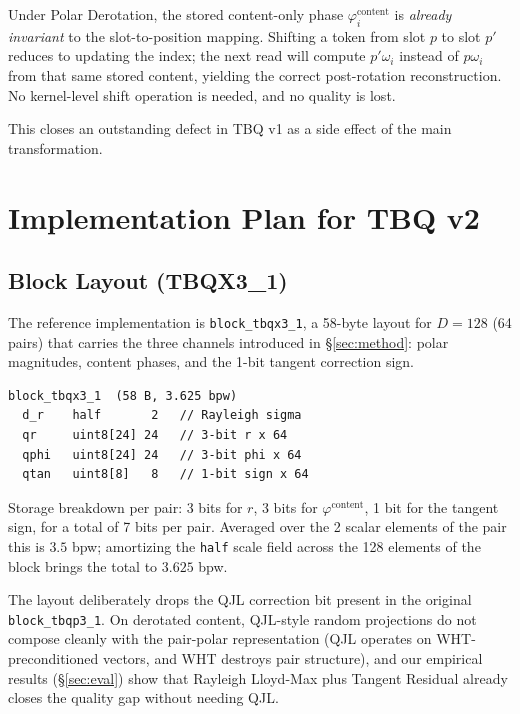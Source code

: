 \documentclass[10pt,twocolumn]{article}
\begin{document}
Under Polar Derotation, the stored content-only phase $\varphi^{\text{content}}_i$ is \emph{already invariant} to the slot-to-position mapping. Shifting a token from slot $p$ to slot $p'$ reduces to updating the index; the next read will compute $p'\omega_i$ instead of $p\omega_i$ from that same stored content, yielding the correct post-rotation reconstruction. No kernel-level shift operation is needed, and no quality is lost.

This closes an outstanding defect in TBQ v1 as a side effect of the main transformation.

\section{Implementation Plan for TBQ v2}
\label{sec:impl}

\subsection{Block Layout (TBQX3\_1)}

The reference implementation is \texttt{block\_tbqx3\_1}, a 58-byte layout for $D=128$ (64 pairs) that carries the three channels introduced in \S\ref{sec:method}: polar magnitudes, content phases, and the 1-bit tangent correction sign.

{\footnotesize
\begin{verbatim}
block_tbqx3_1  (58 B, 3.625 bpw)
  d_r    half       2   // Rayleigh sigma
  qr     uint8[24] 24   // 3-bit r x 64
  qphi   uint8[24] 24   // 3-bit phi x 64
  qtan   uint8[8]   8   // 1-bit sign x 64
\end{verbatim}}

Storage breakdown per pair: 3 bits for $r$, 3 bits for $\varphi^{\text{content}}$, 1 bit for the tangent sign, for a total of 7 bits per pair. Averaged over the 2 scalar elements of the pair this is $3.5$ bpw; amortizing the \texttt{half} scale field across the 128 elements of the block brings the total to $\mathbf{3.625}$ bpw.

The layout deliberately drops the QJL correction bit present in the original \texttt{block\_tbqp3\_1}. On derotated content, QJL-style random projections do not compose cleanly with the pair-polar representation (QJL operates on WHT-preconditioned vectors, and WHT destroys pair structure), and our empirical results (\S\ref{sec:eval}) show that Rayleigh Lloyd-Max plus Tangent Residual already closes the quality gap without needing QJL.
\end{document}
